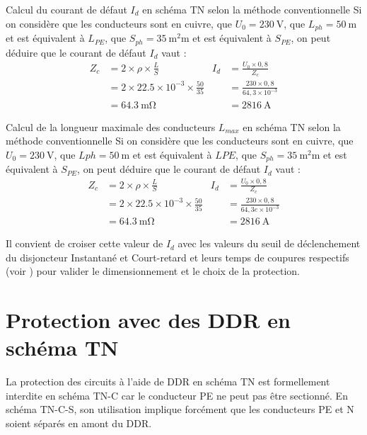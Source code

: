 \begin{exemple}{Calcul du courant de défaut $I_d$ en schéma TN selon la méthode conventionnelle}{}
Si on considère que les conducteurs sont en cuivre, que $U_{0}=\SI{230}{\volt}$, que $L_{ph}=\SI{50}{\meter}$ et est équivalent à $L_{PE}$, que $S_{ph}=\SI{35}{\square\milli\meter}$ et est équivalent à  $S_{PE}$, on peut déduire que le courant de défaut $I_d$ vaut :
\begin{align*}
		Z_{c}	&= 2 \times \rho \times \frac{L}{S}  								& 			I_d		&= \frac{U_0 \times 0,8}{Z_c} \\
					&= 2 \times 22.5 \times 10^{-3} \times \frac{50}{35} 	&						&= \frac{230 \times 0,8}{64,3 \times 10^{-3}} \\
					&= \SI{64,3}{\milli\ohm}						 						& 						&= \SI{2816}{\ampere}
\end{align*}
\end{exemple}

\begin{exemple}{Calcul de la longueur maximale des conducteurs $L_{max}$ en schéma TN selon la méthode conventionnelle}{}
Si on considère que les conducteurs sont en cuivre, que $U_{0}=\SI{230}{\volt}$, que $L{ph}=\SI{50}{\meter}$ et est équivalent à $L{PE}$, que $S_{ph}=\SI{35}{\square\milli\meter}$ et est équivalent à  $S_{PE}$, on peut déduire que le courant de défaut $I_d$ vaut :
\begin{align*}
		Z_{c}	&= 2 \times \rho \times \frac{L}{S}  								& 			I_d		&= \frac{U_0 \times 0,8}{Z_c} \\
					&= 2 \times 22.5 \times 10^{-3} \times \frac{50}{35} 			&				&= \frac{230 \times 0,8}{64,3e \times 10^{-3}} \\
					&= \SI{64,3}{\milli\ohm}						 						& 						&= \SI{2816}{\ampere}
\end{align*}

Il convient de croiser cette valeur de $I_d$ avec les valeurs du seuil de déclenchement du disjoncteur Instantané et Court-retard et leurs temps de coupures respectifs (voir ) pour valider le dimensionnement et le choix de la protection.
\end{exemple}

\section{Protection avec des DDR en schéma TN}

La protection des circuits à l'aide de DDR en schéma TN est formellement interdite en schéma TN-C car le conducteur PE ne peut pas être sectionné. En schéma TN-C-S, son utilisation implique forcément que les conducteurs PE et N soient séparés en amont du DDR.\\

